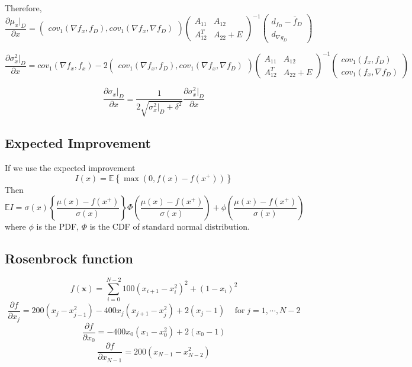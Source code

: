 \documentclass[a4paper,onecolumn]{article}
\theoremstyle{remark}
\begin{document}
Therefore,
\begin{equation}
    \frac{\partial \mu_x|_D}{\partial x} = 
    \begin{pmatrix}
        cov_1(\nabla f_x, f_D) , cov_1(\nabla f_x, \nabla f_D)
    \end{pmatrix}
    \begin{pmatrix}
        A_{11} & A_{12}\\
        A_{12}^T & A_{22} + E
    \end{pmatrix}^{-1}
    \begin{pmatrix}
        d_{f_D} - \bar{f}_D\\
        d_{\nabla g_D}
    \end{pmatrix}
\end{equation}

\begin{equation}
    \frac{\partial \sigma^2_x|_D}{\partial x} = cov_1(\nabla f_x, f_x)
    - 2 
    \begin{pmatrix}
        cov_1(\nabla f_x, f_D) , cov_1(\nabla f_x, \nabla f_D)
    \end{pmatrix}
    \begin{pmatrix}
        A_{11} & A_{12}\\
        A_{12}^T & A_{22} + E
    \end{pmatrix}^{-1}
    \begin{pmatrix}
        cov_1(f_x, f_D) \\ cov_1(f_x, \nabla f_D)
    \end{pmatrix}
\end{equation}

\begin{equation}
    \frac{\partial \sigma_x|_D}{\partial x}
    = \frac{1}{2\sqrt{\sigma^2_x|_D + \delta^2}} \frac{\partial \sigma^2_x|_D}{\partial x}
\end{equation}

\subsection{Expected Improvement}
If we use the expected improvement
\begin{equation}
    I(x) = \mathbb{E}\left\{ \max\left(0, f(x)-f(x^+)\right)\right\}
\end{equation}
Then
\begin{equation}
    \mathbb{E} I = \sigma(x) \left\{ \frac{\mu(x)-f(x^+)}{\sigma(x)} \right\}
    \Phi\left( \frac{\mu(x)-f(x^+)}{\sigma(x)} \right) + \phi\left(\frac{\mu(x)-f(x^+)}{\sigma(x)}\right)
\end{equation}
where $\phi$ is the PDF, $\Phi$ is the CDF of standard normal distribution.

\subsection{Rosenbrock function}
$$
    f(\mathbf{x}) = \sum_{i=0}^{N-2} 100 (x_{i+1} - x_i^2)^2 + (1-x_i)^2
$$
$$
    \frac{\partial f}{\partial x_j} = 200 (x_j-x_{j-1}^2) - 400 x_j (x_{j+1}-x_j^2) + 2(x_j-1)\,
    \quad \textrm{for}\; j=1,\cdots, N-2
$$
$$
    \frac{\partial f}{\partial x_0} = -400 x_0 (x_1-x_0^2) +2(x_0-1)
$$
$$
    \frac{\partial f}{\partial x_{N-1}} = 200 (x_{N-1}-x_{N-2}^2)
$$
\end{document}
